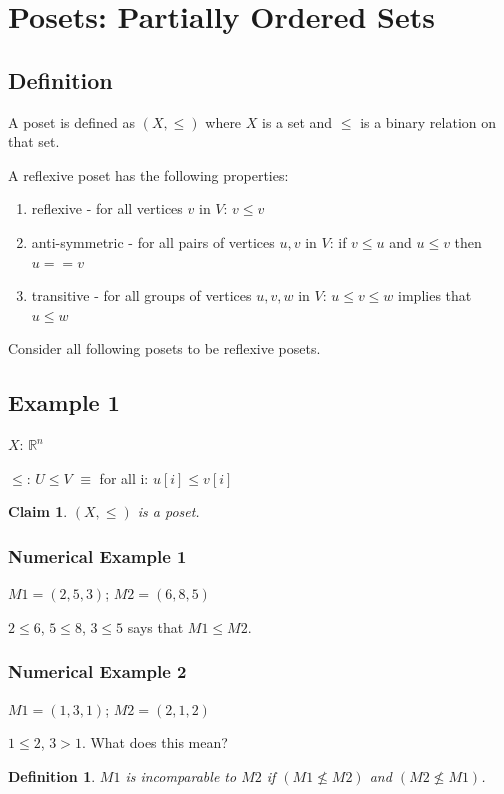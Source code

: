 \documentclass[twoside]{article}
\newtheorem{claim}[theorem]{Claim}
\newtheorem{definition}[theorem]{Definition}
\begin{document}
\section{Posets: Partially Ordered Sets}

\subsection{Definition}
A poset is defined as $(X, \leq)$ where $X$ is a set and $\leq$ is a binary relation on that set.

A reflexive poset has the following properties:
\begin{enumerate}
    \item reflexive - for all vertices $v$ in $V$: $v \leq v$
    \item anti-symmetric - for all pairs of vertices $u,v$ in $V$: if $v \leq u$ and $u \leq v$ then $u == v$
    \item transitive - for all groups of vertices $u,v,w$ in $V$: $u \leq v \leq w$ implies that $u \leq w$
\end{enumerate}

Consider all following posets to be reflexive posets.

\subsection{Example 1}
$X$: $\mathbb{R}^n$

$\leq$: $U \leq V$ $\equiv$ for all i: $u[i] \leq v[i]$

\begin{claim}
$(X, \leq)$ is a poset.
\end{claim}

\subsubsection{Numerical Example 1}
$M1 = (2,5,3)$; $M2 = (6,8,5)$

$2 \leq 6$, $5 \leq 8$, $3 \leq 5$ says that $M1 \leq M2$.

\subsubsection{Numerical Example 2}
$M1 = (1,3,1)$; $M2 = (2,1,2)$

$1 \leq 2$, $3 > 1$. What does this mean?

\begin{definition}
$M1$ is incomparable to $M2$ if $(M1 \nleq M2)$ and $(M2 \nleq M1)$.
\end{definition}
\end{document}
